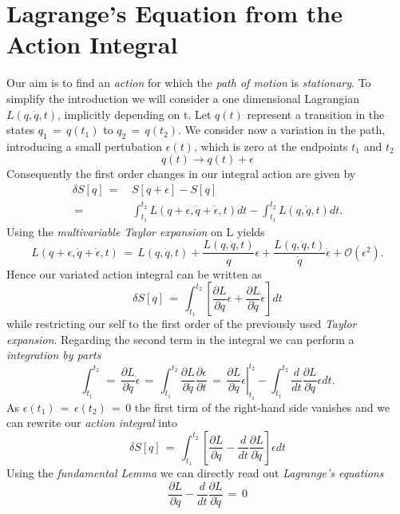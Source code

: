 \section{Lagrange's Equation from the Action Integral}
Our aim is to find an \textit{action} for which the \textit{path of motion} is
\textit{stationary}. To simplify the introduction we will consider a one
dimensional Lagrangian $L(q, \dot q, t)$, implicitly depending on t. Let $q(t)$
represent a transition in the states $q_1 \,=\, q(t_1)$ to $q_2 \,=\, q(t_2)$. We
consider now a variation in the path, introducing a small pertubation
$\epsilon(t)$, which is zero at the endpoints $t_1$ and $t_2$
\begin{equation}
  q(t) \longrightarrow q(t) + \epsilon 
\end{equation}
Consequently the first order changes in our integral action are given by
\begin{equation}
  \begin{aligned}
  \delta S[q] \,=\,& S[q + \epsilon] - S[q] \\
  \,=\,& \int_{t_1}^{t_2} L(q + \epsilon, \dot q + \dot \epsilon, t) dt -
\int_{t_1}^{t_2} L(q, \dot q, t) dt.
  \end{aligned}
\end{equation}
Using the \textit{multivariable Taylor expansion} on L yields
\begin{equation}
  L(q + \epsilon, \dot q + \dot \epsilon, t) \,=\, L(q, \dot q, t) + \frac{L(q,
\dot q, t)}{q} \epsilon + \frac{L(q, \dot q, t)}{\dot q} \dot \epsilon +
\mathcal O(\epsilon^2).
\end{equation}
Hence our variated action integral can be written as 
\begin{equation}
  \delta S[q] \,=\, \int_{t_1}^{t_2} \left[\frac{\partial L}{\partial q} \epsilon +
\frac{\partial L}{\partial \dot q} \dot \epsilon  \right] dt
\end{equation}
while restricting our self to the first order of the previously used
\textit{Taylor expansion}. Regarding the second term in the integral we can
perform a \textit{integration by parts}
\begin{equation}
  \int_{t_1}^{t_2} \,=\, \frac{\partial L}{\partial \dot q} \dot \epsilon \,=\,
\int_{t_1}^{t_2} \frac{\partial L}{\partial \dot q}\frac{\partial
\epsilon}{\partial t} \,=\, \left. \frac{\partial L}{\partial q} \epsilon
\right|_{t_1}^{t_2} - \int_{t_1}^{t_2} \frac{d}{d t} \frac{\partial L}{\partial 
\dot q} \epsilon dt .
\end{equation}
As $\epsilon(t_1) \,=\, \epsilon(t_2) \,=\, 0$ the first tirm of the right-hand
side vanishes and we can rewrite our \textit{action integral} into
\begin{equation}
  \delta S[q] \,=\, \int_{t_1}^{t_2} \left[\frac{\partial L}{\partial q} -
\frac{d}{dt} \frac{\partial L}{\partial \dot q}\right]\epsilon dt  
\end{equation}
Using the \textit{fundamental Lemma} we can directly read out
\textit{Lagrange's equations}
\begin{equation}
  \frac{\partial L}{\partial q} - \frac{d}{dt} \frac{\partial L}{\partial \dot
q }\,=\, 0
\end{equation}


